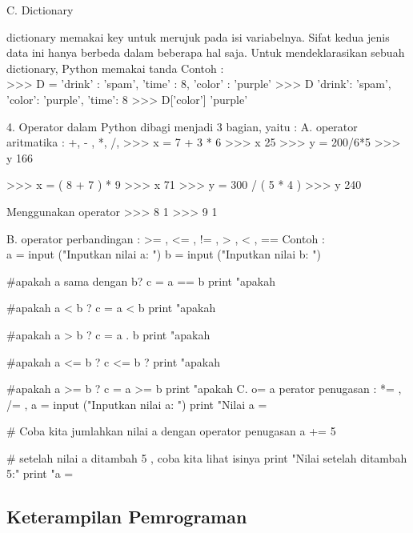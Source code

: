 \begin{enumerate}
C. Dictionary

    dictionary memakai key untuk merujuk pada isi variabelnya. Sifat kedua jenis data ini hanya berbeda dalam beberapa hal saja. Untuk mendeklarasikan sebuah dictionary, Python memakai tanda { }
    Contoh :\\
    >>> D = { 'drink' : 'spam', 'time' : 8, 'color' : 'purple'}
    >>> D {'drink': 'spam', 'color': 'purple', 'time': 8}
    >>> D['color'] 'purple'
    
4. Operator dalam Python dibagi menjadi 3 bagian, yaitu :
    A. operator aritmatika : +, - , *, /, %
        >>> x = 7 + 3 * 6
        >>> x
        25
        >>> y = 200/6*5
        >>> y
        166
        
        
        >>> x = ( 8 + 7 ) * 9
        >>> x
        71
        >>> y = 300 / ( 5 * 4 )
        >>> y
        240
        
Menggunakan operator %
        >>> 8 %
        1
        >>> 9 %
        1
        
    B. operator perbandingan : >= , <= , != , > , < , ==
        Contoh :\\
        a = input ("Inputkan nilai a: ")
        b = input ("Inputkan nilai b: ")
    
    #apakah a sama dengan b?
        c = a == b
        print "apakah %
        
    #apakah a < b ?
        c = a < b
        print "apakah %
        
    #apakah a > b ?
        c = a . b
        print "apakah %
        
    #apakah a <= b ?
        c 
   <= b ?
        print "apakah %
        
    #apakah a >= b ?
        c = a >= b
        print "apakah %
    C. o= a perator penugasan : *= , /= , %
        a = input ("Inputkan nilai a: ")
        print "Nilai a = %
        
    # Coba kita jumlahkan nilai a dengan operator penugasan
        a += 5
        
    # setelah nilai a ditambah 5 , coba kita lihat isinya
        print "Nilai setelah ditambah 5:"
        print "a = %
    
\subsection{Keterampilan Pemrograman}


\end{enumerate}
